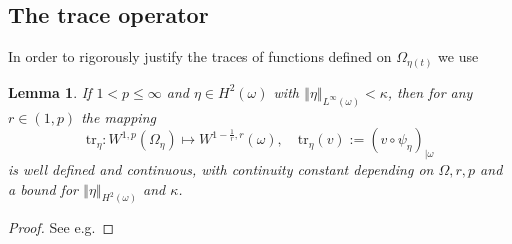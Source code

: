 \documentclass[10pt,a4paper]{article}
\newtheorem{lemma}[theorem]{Lemma}
\newcommand{\abs}[1]{|#1|}
\newcommand{\bfp}{\mathbf{p}}
\numberwithin{equation}{section}
\begin{document}


\subsection{The trace operator}
In order to  rigorously justify the traces  of  functions  defined on $\Omega_{\eta(t)}$ we use 
\begin{lemma}\label{lm:trace}  If $1 < p \le \infty$ and $\eta \in H^{2}(\omega)$ with $\left\Vert \eta\right\Vert _{L^{\infty}\left(\omega\right)}<\kappa$, then for any $r \in (1,p)$ the mapping \[\text{tr}_{\eta}:W^{1,p}\left(\Omega_{\eta}\right)\mapsto W^{1-\frac{1}{r},r}\left(\omega\right),\quad\text{tr}_{\eta}\left(v\right):=\left(v\circ\psi_{\eta}\right)_{|\omega}\] is well defined and continuous, with continuity constant depending on $\Omega, r, p$ and a bound for $\left\Vert \eta\right\Vert _{H^{2}\left(\omega\right)}$ and $\kappa$.
\end{lemma}
  \begin{proof}
    See e.g.\cite[Corollary 2.9]{LR14}
  \end{proof}
 
\end{document}

